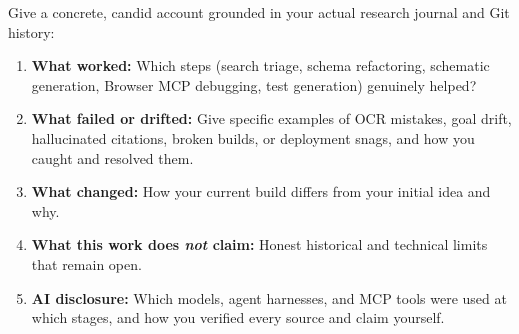 \documentclass[12pt,a4paper]{article}
\begin{document}
Give a concrete, candid account grounded in your actual research journal and Git
history:
\begin{enumerate}
  \item \textbf{What worked:} Which steps (search triage, schema refactoring,
  schematic generation, Browser MCP debugging, test generation) genuinely helped?
  \item \textbf{What failed or drifted:} Give specific examples of OCR mistakes,
  goal drift, hallucinated citations, broken builds, or deployment snags, and how
  you caught and resolved them.
  \item \textbf{What changed:} How your current build differs from your initial
  idea and why.
  \item \textbf{What this work does \emph{not} claim:} Honest historical and
  technical limits that remain open.
  \item \textbf{AI disclosure:} Which models, agent harnesses, and MCP tools were
  used at which stages, and how you verified every source and claim yourself.
\end{enumerate}

\singlespacing
\printbibliography[title={Bibliography}]
\end{document}
